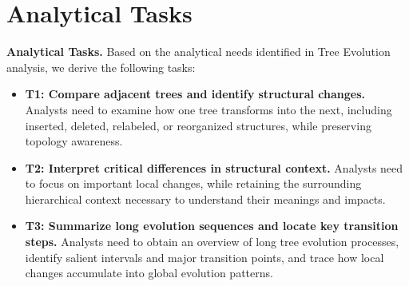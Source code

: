 \section{Analytical Tasks}

\textbf{Analytical Tasks.}
Based on the analytical needs identified in Tree Evolution analysis, we derive the following tasks:

\begin{itemize}
	\item \textbf{T1: Compare adjacent trees and identify structural changes.}
	Analysts need to examine how one tree transforms into the next, including inserted, deleted, relabeled, or reorganized structures, while preserving topology awareness.
	
	\item \textbf{T2: Interpret critical differences in structural context.}
	Analysts need to focus on important local changes, while retaining the surrounding hierarchical context necessary to understand their meanings and impacts.
	
	\item \textbf{T3: Summarize long evolution sequences and locate key transition steps.}
	Analysts need to obtain an overview of long tree evolution processes, identify salient intervals and major transition points, and trace how local changes accumulate into global evolution patterns.
\end{itemize}